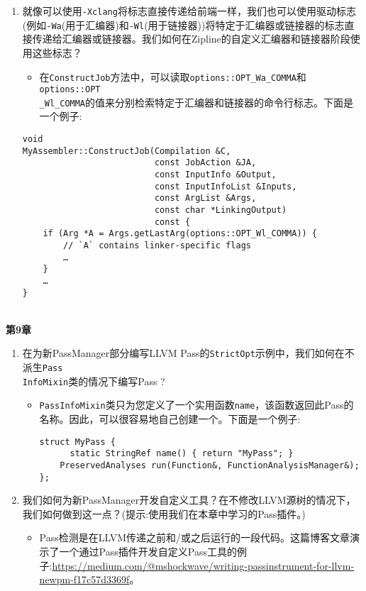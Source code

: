 \begin{enumerate}
\item 就像可以使用\texttt{-Xclang}将标志直接传递给前端一样，我们也可以使用驱动标志(例如\texttt{-Wa}(用于汇编器)和\texttt{-Wl}(用于链接器))将特定于汇编器或链接器的标志直接传递给汇编器或链接器。我们如何在Zipline的自定义汇编器和链接器阶段使用这些标志？

\begin{itemize}
\item 在\texttt{ConstructJob}方法中，可以读取\texttt{options::OPT\_Wa\_COMMA}和\texttt{options::OPT\\\_Wl\_COMMA}的值来分别检索特定于汇编器和链接器的命令行标志。下面是一个例子:
\end{itemize}

\begin{lstlisting}[style=styleCXX]
void
MyAssembler::ConstructJob(Compilation &C,
						  const JobAction &JA,
						  const InputInfo &Output,
						  const InputInfoList &Inputs,
						  const ArgList &Args,
						  const char *LinkingOutput)
						  const {
	if (Arg *A = Args.getLastArg(options::OPT_Wl_COMMA)) {
		// `A` contains linker-specific flags
		…
	}
	…
}
\end{lstlisting}

\end{enumerate}


\hspace*{\fill} \\ %
\noindent
\textbf{第9章}

\begin{enumerate}
\item 在为新PassManager部分编写LLVM Pass的\texttt{StrictOpt}示例中，我们如何在不派生\texttt{Pass\\InfoMixin}类的情况下编写Pass ?

\begin{itemize}
\item \texttt{PassInfoMixin}类只为您定义了一个实用函数\texttt{name}，该函数返回此Pass的名称。因此，可以很容易地自己创建一个。下面是一个例子:

\begin{lstlisting}[style=styleCXX]
struct MyPass {
	  static StringRef name() { return "MyPass"; }
	PreservedAnalyses run(Function&, FunctionAnalysisManager&);
};
\end{lstlisting}

\end{itemize}

\item 我们如何为新PassManager开发自定义工具？在不修改LLVM源树的情况下，我们如何做到这一点？(提示:使用我们在本章中学习的Pass插件。)

\begin{itemize}
\item Pass检测是在LLVM传递之前和/或之后运行的一段代码。这篇博客文章演示了一个通过Pass插件开发自定义Pass工具的例子:\url{https://medium.com/@mshockwave/writing-passinstrument-for-llvm-newpm-f17c57d3369f}。
\end{itemize}

\end{enumerate}

